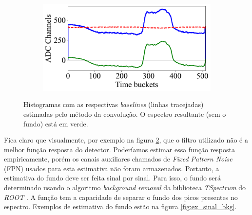 \documentclass[a4paper,12pt,oneside]{book}
\begin{document}
\begin{figure}[H]
\begin{subfigure}[b]{0.45\textwidth}
        \caption{}
        \label{subfig:bs_fourier_3}
    \end{subfigure}%
    \hfill
    \begin{subfigure}[b]{0.45\textwidth}
        \centering
        \includegraphics[scale=0.45]{figs/bs_fourier_4.png}
        \caption{}
        \label{subfig:bs_fourier_4}
    \end{subfigure}
\caption{Histogramas com as respectivas \textit{baselines} (linhas tracejadas) estimadas pelo método da convolução. O espectro resultante (sem o fundo) está em verde.}
\label{fig:bs_fourier_exs}
\end{figure}


\par Fica claro que visualmente, por exemplo na figura \ref{subfig:bs_fourier_4}, que o filtro utilizado não é a melhor função resposta do detector. Poderíamos estimar essa função resposta empiricamente, porém os canais auxiliares chamados de \textit{Fixed Pattern Noise} (FPN)\cite{GET} usados para esta estimativa não foram armazenados. Portanto, a estimativa do fundo deve ser feita sinal por sinal\cite{FORTINO2022166497, GET}. Para isso, o fundo será determinado usando o algoritmo \textit{background removal} da biblioteca \textit{TSpectrum} do \textit{ROOT} \cite{root}. A função tem a capacidade de separar o fundo dos picos presentes no espectro\cite{BKG_1, BKG_2, BKG_3}. Exemplos de estimativa do fundo estão na figura \ref{fig:ex_sinal_bkg}.



\end{document}
